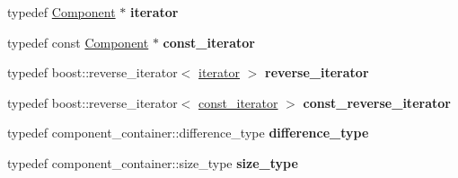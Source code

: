 \begin{DoxyCompactItemize}
\item 
typedef \hyperlink{classndn_1_1name_1_1Component}{Component} $\ast$ {\bfseries iterator}\hypertarget{classndn_1_1Name_ac11fc7a9facca40794ea9bd4783a776f}{}\label{classndn_1_1Name_ac11fc7a9facca40794ea9bd4783a776f}

\item 
typedef const \hyperlink{classndn_1_1name_1_1Component}{Component} $\ast$ {\bfseries const\+\_\+iterator}\hypertarget{classndn_1_1Name_acd2e8ed0e76764dfbb5babfd86094313}{}\label{classndn_1_1Name_acd2e8ed0e76764dfbb5babfd86094313}

\item 
typedef boost\+::reverse\+\_\+iterator$<$ \hyperlink{classndn_1_1name_1_1Component}{iterator} $>$ {\bfseries reverse\+\_\+iterator}\hypertarget{classndn_1_1Name_afdd9605ccc23ae40a1030ca447e35d97}{}\label{classndn_1_1Name_afdd9605ccc23ae40a1030ca447e35d97}

\item 
typedef boost\+::reverse\+\_\+iterator$<$ \hyperlink{classndn_1_1name_1_1Component}{const\+\_\+iterator} $>$ {\bfseries const\+\_\+reverse\+\_\+iterator}\hypertarget{classndn_1_1Name_a598c37209d1f7cbfc1e63e9d5384dd17}{}\label{classndn_1_1Name_a598c37209d1f7cbfc1e63e9d5384dd17}

\item 
typedef component\+\_\+container\+::difference\+\_\+type {\bfseries difference\+\_\+type}\hypertarget{classndn_1_1Name_ae821793b351cf29a6d0689d8fca260e4}{}\label{classndn_1_1Name_ae821793b351cf29a6d0689d8fca260e4}

\item 
typedef component\+\_\+container\+::size\+\_\+type {\bfseries size\+\_\+type}\hypertarget{classndn_1_1Name_a11b67463e279ae35848af70701a46b9b}{}\label{classndn_1_1Name_a11b67463e279ae35848af70701a46b9b}

\end{DoxyCompactItemize}
